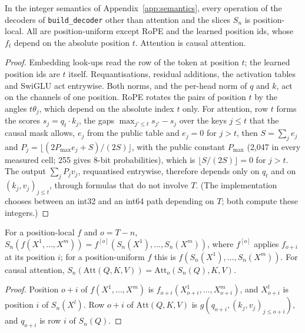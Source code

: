 \begin{lemma}
\label{lem:prune-local}
In the integer semantics of Appendix~\ref{app:semantics}, every operation of the decoders of
\texttt{build\_decoder} other than attention and the slices $S_n$ is position-local. All are
position-uniform except RoPE and the learned position ids, whose $f_t$ depend on the absolute
position $t$. Attention is causal attention.
\end{lemma}

\begin{proof}
Embedding look-ups read the row of the token at position $t$; the learned position ids are $t$
itself. Requantisations, residual additions, the activation tables and SwiGLU act entrywise. Both
norms, and the per-head norm of $q$ and $k$, act on the channels of one position. RoPE rotates the
pairs of position $t$ by the angles $t\theta_j$, which depend on the absolute index $t$ only. For
attention, row $t$ forms the scores $s_j=q_t\cdot k_j$, the gaps $\max_{j'\le t}s_{j'}-s_j$ over the
keys $j\le t$ that the causal mask allows, $e_j$ from the public table and $e_j=0$ for $j>t$, then
$S=\sum_je_j$ and $P_j=\lfloor(2P_{\max}e_j+S)/(2S)\rfloor$, with the public constant $P_{\max}$
(2{,}047 in every measured cell; 255 gives 8-bit probabilities), which is $\lfloor S/(2S)\rfloor=0$ for
$j>t$.
The output $\sum_jP_jv_j$, requantised entrywise, therefore depends only on $q_t$ and on
$(k_j,v_j)_{j\le t}$, through formulas that do not involve $T$. (The implementation chooses between
an int32 and an int64 path depending on $T$; both compute these integers.)
\end{proof}

\begin{lemma}
\label{lem:prune-slice}
For a position-local $f$ and $o=T-n$, $S_n(f(X^1,\dots,X^m))=f^{[o]}(S_n(X^1),\dots,S_n(X^m))$,
where $f^{[o]}$ applies $f_{o+i}$ at its position $i$; for a position-uniform $f$ this is
$f(S_n(X^1),\dots,S_n(X^m))$. For causal attention,
$S_n(\mathrm{Att}(Q,K,V))=\mathrm{Att}_{o}(S_n(Q),K,V)$.
\end{lemma}

\begin{proof}
Position $o+i$ of $f(X^1,\dots,X^m)$ is $f_{o+i}(X^1_{o+i},\dots,X^m_{o+i})$, and $X^l_{o+i}$ is
position $i$ of $S_n(X^l)$. Row $o+i$ of $\mathrm{Att}(Q,K,V)$ is
$g(q_{o+i},(k_j,v_j)_{j\le o+i})$, and $q_{o+i}$ is row $i$ of $S_n(Q)$.
\end{proof}

